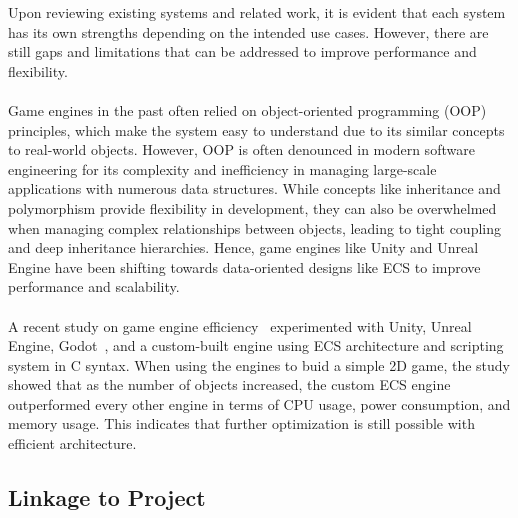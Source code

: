 Upon reviewing existing systems and related work, it is evident that each system has its own strengths depending 
on the intended use cases.
However, there are still gaps and limitations that can be addressed to improve performance and flexibility.
\\\\
Game engines in the past often relied on object-oriented programming (OOP) principles, which make the system easy to 
understand due to its similar concepts to real-world objects.
However, OOP is often denounced in modern software engineering for its complexity and inefficiency in managing 
large-scale applications with numerous data structures.
While concepts like inheritance and polymorphism provide flexibility in development, they can also be overwhelmed 
when managing complex relationships between objects, leading to tight coupling and deep inheritance hierarchies.
Hence, game engines like Unity and Unreal Engine have been shifting towards data-oriented designs like ECS to improve 
performance and scalability.
\\\\
A recent study on game engine efficiency~\cite{Game_Engine_Efficiency} experimented with Unity, Unreal Engine, 
Godot~\cite{Godot_Engine}, and a custom-built engine using ECS architecture and scripting system in C syntax.
When using the engines to buid a simple 2D game, the study showed that as the number of objects increased, the custom 
ECS engine outperformed every other engine in terms of CPU usage, power consumption, and memory usage.
This indicates that further optimization is still possible with efficient architecture.

\subsection{Linkage to Project}
\label{subsec:linkage-to-project}